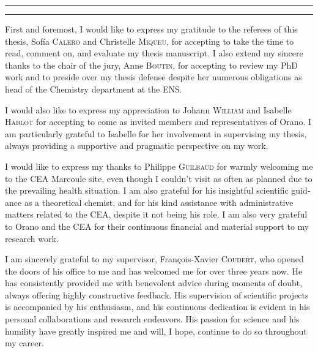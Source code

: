 \begin{otherlanguage}{english}

\hrule\relax
\vspace*{.9\baselineskip}%
\raggedright{\huge{}}\par%
\vspace*{1.1\baselineskip}%
\hrule\relax
\vspace*{\baselineskip}%
\thispagestyle{empty}

\begingroup
\itshape

First and foremost, I would like to express my gratitude to the referees of this thesis, Sof{\'{i}}a \textsc{Calero} and Christelle \textsc{Miqueu}, for accepting to take the time to read, comment on, and evaluate my thesis manuscript. 
I also extend my sincere thanks to the chair of the jury, Anne \textsc{Boutin}, for accepting to review my PhD work and to preside over my thesis defense despite her numerous obligations as head of the Chemistry department at the ENS.

I would also like to express my appreciation to Johann \textsc{William} and Isabelle \textsc{Hablot} for accepting to come as invited members and representatives of Orano. I am particularly grateful to Isabelle for her involvement in supervising my thesis, always providing a supportive and pragmatic perspective on my work.

I would like to express my thanks to Philippe \textsc{Guilbaud} for warmly welcoming me to the CEA Marcoule site, even though I couldn't visit as often as planned due to the prevailing health situation. I am also grateful for his insightful scientific guidance as a theoretical chemist, and for his kind assistance with administrative matters related to the CEA, despite it not being his role. I am also very grateful to Orano and the CEA for their continuous financial and material support to my research work.

I am sincerely grateful to my supervisor, François-Xavier \textsc{Coudert}, who opened the doors of his office to me and has welcomed me for over three years now. He has consistently provided me with benevolent advice during moments of doubt, always offering highly constructive feedback. His supervision of scientific projects is accompanied by his enthusiasm, and his continuous dedication is evident in his personal collaborations and research endeavors. His passion for science and his humility have greatly inspired me and will, I hope, continue to do so throughout my career.


\end{otherlanguage}
